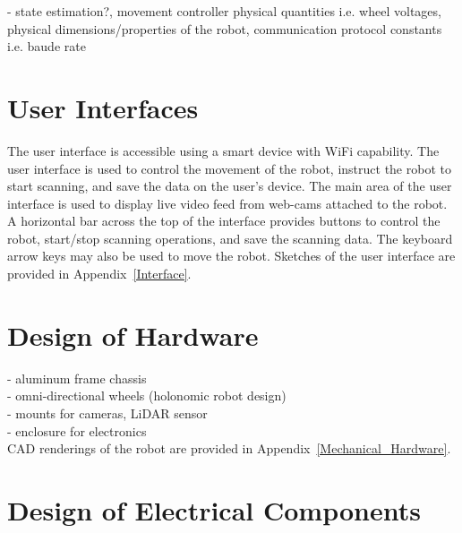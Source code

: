 \documentclass[12pt, titlepage]{article}
\begin{document}
- state estimation?, movement controller physical quantities i.e. wheel voltages, physical dimensions/properties of the robot, communication protocol constants i.e. baude rate

\section{User Interfaces}
\label{sec_User}


The user interface is accessible using a smart device with WiFi capability. The user interface is used to control the movement of the robot, instruct the robot to start scanning, and save the data on the user's device. The main area of the user interface is used to display live video feed from web-cams attached to the robot. A horizontal bar across the top of the interface provides buttons to control the robot, start/stop scanning operations, and save the scanning data. The keyboard arrow keys may also be used to move the robot. Sketches of the user interface are provided in Appendix~\ref{Interface}.


\section{Design of Hardware}
\label{sec_Mech}


- aluminum frame chassis\\
- omni-directional wheels (holonomic robot design)\\
- mounts for cameras, LiDAR sensor\\
- enclosure for electronics\\

CAD renderings of the robot are provided in Appendix~\ref{Mechanical_Hardware}.

\section{Design of Electrical Components}
\label{sec_Elec}

\end{document}
